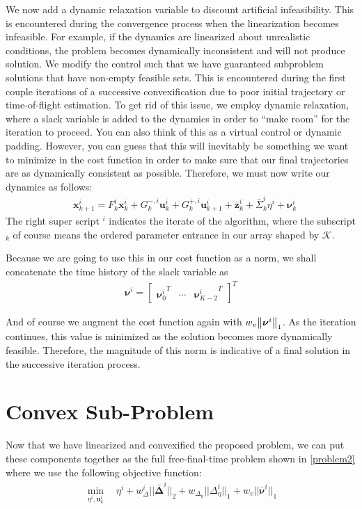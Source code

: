 We now add a dynamic relaxation variable to discount artificial infeasibility. This is encountered during the convergence process when the linearization becomes infeasible. For example, if the dynamics are linearized about unrealistic conditions, the problem becomes dynamically inconsistent and will not produce solution. We modify the control such that we have guaranteed subproblem solutions that have non-empty feasible sets. This is encountered during the first couple iterations of a successive convexification due to poor initial trajectory or time-of-flight estimation. To get rid of this issue, we employ dynamic relaxation, where a slack variable is added to the dynamics in order to ``make room'' for the iteration to proceed. You can also think of this as a virtual control or dynamic padding. However, you can guess that this will inevitably be something we want to minimize in the cost function in order to make sure that our final trajectories are as dynamically consistent as possible. Therefore, we must now write our dynamics as follows: 
%
\begin{align}
& \mathbf{x}_{k+1}^i = F_k^i\mathbf{x}_k^i + G^{-,i}_k\mathbf{u}_k^i + G_k^{+,i}\mathbf{u}_{k+1}^i + \bar{\mathbf{z}}^i_k +\bar{\Sigma}_k^i\eta^i + \bm{\nu}_k^i
\end{align}
The right super script $^i$ indicates the iterate of the algorithm, where the subscript $_k$ of course means the ordered parameter entrance in our array shaped by $\mathcal{K}$.

Because we are going to use this in our cost function as a norm, we shall concatenate the time history of the slack variable as
\begin{align}
\bm{\nu}^i = 
	\begin{bmatrix}
	{\bm{\nu}_0^i}^T & \cdots & {\bm{\nu}^i_{K-2}}^T 
	\end{bmatrix}^T
\end{align}

And of course we augment the cost function again with $w_v \norm{\bm{\nu}^i}_1$. As the iteration continues, this value is minimized as the solution becomes more dynamically feasible. Therefore, the magnitude of this norm is indicative of a final solution in the successive iteration process.

\section{Convex Sub-Problem}
Now that we have linearized and convexified the proposed problem, we can put these components together as the full free-final-time problem shown in \ref{problem2} where we use the following objective function:
\begin{align}
	\min_{\eta^i, \mathbf{u}_k^i} \quad \eta^i + w_\Delta^i || \bm{\bar{\Delta}}^i ||_2 + w_{\Delta_\eta} || \Delta_\eta^i ||_1 + w_v || \bar{\bm{\nu}}^i ||_1
\end{align}

